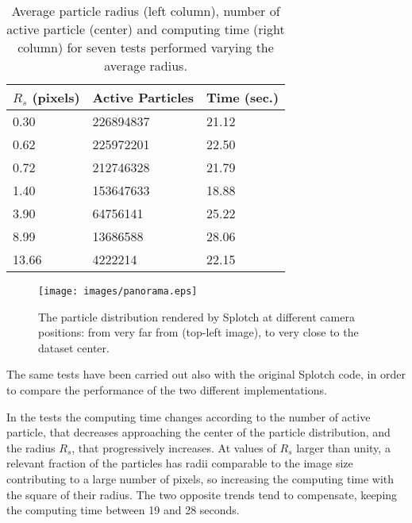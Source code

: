 \documentclass[1p]{elsarticle}
\begin{document}
\begin{table}
\begin{center}
\begin{tabular}{|l|l|l|}
\hline
$R_s$ (pixels) & Active Particles & Time (sec.) \\
\hline
0.30   & 226894837  & 21.12 \\
\hline
0.62   & 225972201  & 22.50 \\
\hline
0.72   & 212746328  & 21.79 \\
\hline
1.40   & 153647633  & 18.88 \\
\hline
3.90   & 64756141   & 25.22 \\
\hline
8.99   & 13686588   & 28.06 \\
\hline
13.66  & 4222214    & 22.15 \\
\hline
\end{tabular}
\end{center}
\caption{Average particle radius (left column), number of active particle (center)
and computing time (right column) for seven tests performed varying the average radius.}
\label{tab:radius}
\end{table}


\begin{figure}
\centering
\texttt{[image: images/panorama.eps]}
\caption{The particle distribution rendered by Splotch at different camera positions: from very 
far from (top-left image), to very close to the dataset center.}
\label{fig:panorama}
\end{figure}

The same tests have been carried out also with the original Splotch code, in order 
to compare the performance of the two different implementations. 

In the tests the computing time changes according
to the number of active particle, that decreases approaching the center of the particle 
distribution, and the radius $R_s$, that progressively increases. At values of 
$R_s$ larger than unity, a relevant fraction of the particles has radii comparable to the image size
contributing to a large number of pixels, so increasing the computing time 
with the square of their radius. The two opposite trends tend to compensate, keeping  
the computing time between 19 and 28 seconds.

\end{document}

